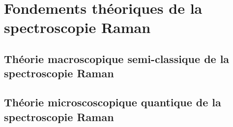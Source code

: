 \chapter{Fondements théoriques de la spectroscopie Raman}

\section{Théorie macroscopique semi-classique de la spectroscopie Raman}

\section{Théorie microscoscopique quantique de la spectroscopie Raman}